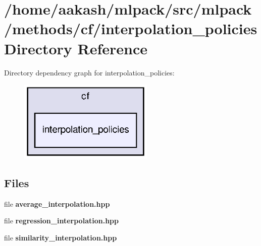 \section{/home/aakash/mlpack/src/mlpack/methods/cf/interpolation\+\_\+policies Directory Reference}
\label{dir_11eea49d07631ee47eb0f28cb447394b}
Directory dependency graph for interpolation\+\_\+policies\+:
\nopagebreak
\begin{figure}[H]
\begin{center}
\leavevmode
\includegraphics[width=182pt]{dir_11eea49d07631ee47eb0f28cb447394b_dep}
\end{center}
\end{figure}
\subsection*{Files}
\begin{DoxyCompactItemize}
\item 
file \textbf{ average\+\_\+interpolation.\+hpp}
\item 
file \textbf{ regression\+\_\+interpolation.\+hpp}
\item 
file \textbf{ similarity\+\_\+interpolation.\+hpp}
\end{DoxyCompactItemize}
